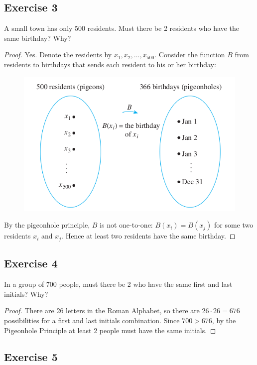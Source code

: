 \documentclass[14pt]{extarticle}
\begin{document}
\subsection{Exercise 3}
A small town has only 500 residents. Must there be 2 residents who have the same birthday? Why?

\begin{proof}
Yes. Denote the residents by \(x_1, x_2, \ldots, x_{500}\). Consider the function \(B\) from residents to birthdays 
that sends each resident to his or her birthday:

\begin{figure}[ht!]
\centering
\includegraphics[scale=0.5]{../images/9.4.3.png}
\end{figure}

By the pigeonhole principle, \(B\) is not one-to-one: \(B(x_i) = B(x_j)\) for some two residents \(x_i\) and 
\(x_j\). Hence at least two residents have the same birthday.
\end{proof}

\subsection{Exercise 4}
In a group of 700 people, must there be 2 who have the same first and last initials? Why?

\begin{proof}
There are 26 letters in the Roman Alphabet, so there are \(26 \cdot 26 = 676\) possibilities for a first and last
initials combination. Since \(700 > 676\), by the Pigeonhole Principle at least 2 people must have the same initials.
\end{proof}

\subsection{Exercise 5}
\end{document}
